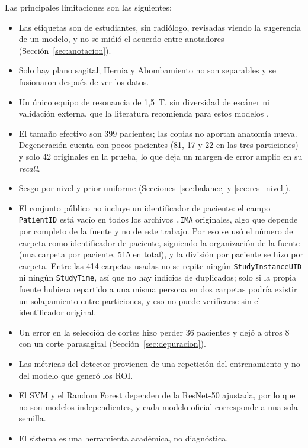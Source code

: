 Las principales limitaciones son las siguientes:
\begin{itemize}
  \item Las etiquetas son de estudiantes, sin radiólogo, revisadas viendo la sugerencia de un modelo, y no se midió el acuerdo entre anotadores (Sección~\ref{sec:anotacion}).
  \item Solo hay plano sagital; Hernia y Abombamiento no son separables y se fusionaron después de ver los datos.
  \item Un único equipo de resonancia de 1,5~T, sin diversidad de escáner ni validación externa, que la literatura recomienda para estos modelos \cite{nigru2024,wang2025}.
  \item El tamaño efectivo son 399 pacientes; las copias no aportan anatomía nueva. Degeneración cuenta con pocos pacientes (81, 17 y 22 en las tres particiones) y solo 42 originales en la prueba, lo que deja un margen de error amplio en su \emph{recall}.
  \item Sesgo por nivel y prior uniforme (Secciones~\ref{sec:balance} y \ref{sec:res_nivel}).
  \item El conjunto público no incluye un identificador de paciente: el campo \texttt{PatientID} está vacío en todos los archivos \texttt{.IMA} originales, algo que depende por completo de la fuente y no de este trabajo. Por eso se usó el número de carpeta como identificador de paciente, siguiendo la organización de la fuente (una carpeta por paciente, 515 en total), y la división por paciente se hizo por carpeta. Entre las 414 carpetas usadas no se repite ningún \texttt{StudyInstanceUID} ni ningún \texttt{StudyTime}, así que no hay indicios de duplicados; solo si la propia fuente hubiera repartido a una misma persona en dos carpetas podría existir un solapamiento entre particiones, y eso no puede verificarse sin el identificador original.
  \item Un error en la selección de cortes hizo perder 36 pacientes y dejó a otros 8 con un corte parasagital (Sección~\ref{sec:depuracion}).
  \item Las métricas del detector provienen de una repetición del entrenamiento y no del modelo que generó los ROI.
  \item El SVM y el Random Forest dependen de la ResNet-50 ajustada, por lo que no son modelos independientes, y cada modelo oficial corresponde a una sola semilla.
  \item El sistema es una herramienta académica, no diagnóstica.
\end{itemize}

